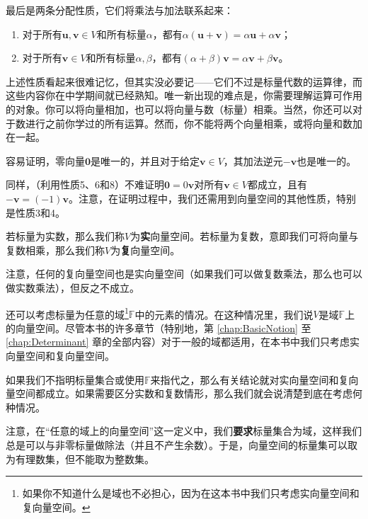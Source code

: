 最后是两条分配性质，它们将乘法与加法联系起来：

\begin{enumerate}[start=7]
    \item 对于所有$\mathbf{u},\mathbf{v}\in V$和所有标量$\alpha$，都有$\alpha(\mathbf{u}+\mathbf{v})=\alpha\mathbf{u}+\alpha\mathbf{v}$；
    \item 对于所有$\mathbf{v}\in V$和所有标量$\alpha,\beta$，都有$(\alpha+\beta)\mathbf{v}=\alpha\mathbf{v}+\beta\mathbf{v}$。
\end{enumerate}

\begin{remark*}
    上述性质看起来很难记忆，但其实没必要记——它们不过是标量代数的运算律，而这些内容你在中学期间就已经熟知。唯一新出现的难点是，你需要理解运算可作用的对象。你可以将向量相加，也可以将向量与数（标量）相乘。当然，你还可以对于数进行之前你学过的所有运算。然而，你不能将两个向量相乘，或将向量和数加在一起。
\end{remark*}

\begin{remark*}
    容易证明，零向量$\mathbf{0}$是唯一的，并且对于给定$\mathbf{v}\in V$，其加法逆元$-\mathbf{v}$也是唯一的。

    同样，（利用性质5、6和8）不难证明$\mathbf{0} = 0\mathbf{v}$对所有$\mathbf{v}\in V$都成立，且有$-\mathbf{v}=(-1)\mathbf{v}$。注意，在证明过程中，我们还需用到向量空间的其他性质，特别是性质3和4。
\end{remark*}

若标量为实数，那么我们称$V$为{\bf 实}向量空间。若标量为复数，意即我们可将向量与复数相乘，那么我们称$V$为{\bf 复}向量空间。

注意，任何的复向量空间也是实向量空间（如果我们可以做复数乘法，那么也可以做实数乘法），但反之不成立。

还可以考虑标量为任意的域\footnote{如果你不知道什么是域也不必担心，因为在这本书中我们只考虑实向量空间和复向量空间。}$\mathbb{F}$中的元素的情况。在这种情况里，我们说$V$是域$\mathbb{F}$上的向量空间。尽管本书的许多章节（特别地，第 \ref{chap:BasicNotion} 至 \ref{chap:Determinant} 章的全部内容）对于一般的域都适用，在本书中我们只考虑实向量空间和复向量空间。

如果我们不指明标量集合或使用$\mathbb{F}$来指代之，那么有关结论就对实向量空间和复向量空间都成立。如果需要区分实数和复数情形，那么我们就会说清楚到底在考虑何种情况。

注意，在“任意的域上的向量空间”这一定义中，我们{\bf 要求}标量集合为域，这样我们总是可以与非零标量做除法（并且不产生余数）。于是，向量空间的标量集可以取为有理数集，但不能取为整数集。

